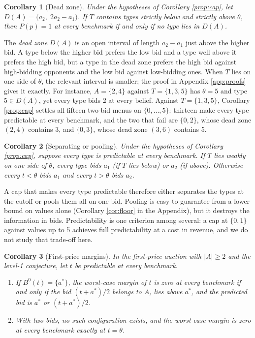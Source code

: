 \documentclass[12pt]{article}
\newtheorem{corollary}{Corollary}
\theoremstyle{definition}
\begin{document}
\begin{corollary}[Dead zone]\label{cor:deadzone}
Under the hypotheses of Corollary \ref{prop:cap}, let $D(A) = \bigl(a_2,\; 2a_2 - a_1\bigr)$. If $T$ contains types strictly below and strictly above $\theta$, then $P(p) = 1$ at every benchmark if and only if no type lies in $D(A)$.
\end{corollary}

The \emph{dead zone} $D(A)$ is an open interval of length $a_2 - a_1$ just above the higher bid. A type below the higher bid prefers the low bid and a type well above it prefers the high bid, but a type in the dead zone prefers the high bid against high-bidding opponents and the low bid against low-bidding ones. When $T$ lies on one side of $\theta$, the relevant interval is smaller; the proof in Appendix \ref{app:proofs} gives it exactly. For instance, $A = \{2, 4\}$ against $T = \{1, 3, 5\}$ has $\theta = 5$ and type $5 \in D(A)$, yet every type bids 2 at every belief. Against $T = \{1,3,5\}$, Corollary \ref{prop:cap} settles all fifteen two-bid menus on $\{0, \dots, 5\}$: thirteen make every type predictable at every benchmark, and the two that fail are $\{0,2\}$, whose dead zone $(2,4)$ contains 3, and $\{0,3\}$, whose dead zone $(3,6)$ contains 5.

\begin{corollary}[Separating or pooling]\label{cor:sepool}
Under the hypotheses of Corollary \ref{prop:cap}, suppose every type is predictable at every benchmark. If $T$ lies weakly on one side of $\theta$, every type bids $a_1$ (if $T$ lies below) or $a_2$ (if above). Otherwise every $t < \theta$ bids $a_1$ and every $t > \theta$ bids $a_2$.
\end{corollary}

A cap that makes every type predictable therefore either separates the types at the cutoff or pools them all on one bid. Pooling is easy to guarantee from a lower bound on values alone (Corollary \ref{cor:floor} in the Appendix), but it destroys the information in bids. Predictability is one criterion among several: a cap at $\{0,1\}$ against values up to 5 achieves full predictability at a cost in revenue, and we do not study that trade-off here.

\begin{corollary}[First-price margins]\label{cor:fpmargins}
In the first-price auction with $|A| \ge 2$ and the level-1 conjecture, let $t$ be predictable at every benchmark.
\begin{enumerate}
\item[(i)] If $B^0(t) = \{a^*\}$, the worst-case margin of $t$ is zero at every benchmark if and only if the bid $(t + a^*)/2$ belongs to $A$, lies above $a^*$, and the predicted bid is $a^*$ or $(t+a^*)/2$.
\item[(ii)] With two bids, no such configuration exists, and the worst-case margin is zero at every benchmark exactly at $t = \theta$.
\end{enumerate}
\end{corollary}
\end{document}
